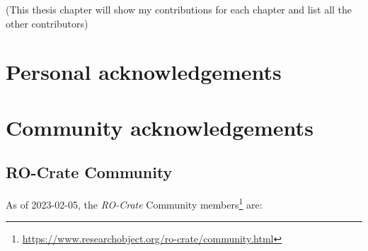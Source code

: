 (This thesis chapter will show my contributions for each chapter and
list all the other contributors)

\hypertarget{personal-acknowledgements}{%
\section{Personal acknowledgements}\label{personal-acknowledgements}}

\hypertarget{community-acknowledgements}{%
\section{Community
acknowledgements}\label{community-acknowledgements}}

\subsection{RO-Crate Community}\label{communitylist}
\label{ro-crate-community}

As of 2023-02-05, the \emph{RO-Crate} Community members\footnote{\url{https://www.researchobject.org/ro-crate/community.html}} are:

